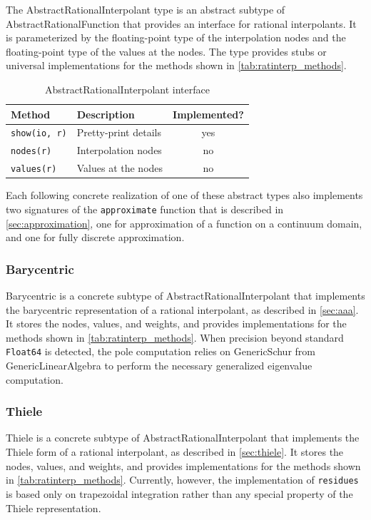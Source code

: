 \documentclass{juliacon}
\begin{document}
The AbstractRationalInterpolant type is an abstract subtype of \textsf{AbstractRationalFunction} that provides an interface for rational interpolants. It is parameterized by the floating-point type of the interpolation nodes and the floating-point type of the values at the nodes. The type provides stubs or universal implementations for the methods shown in \autoref{tab:ratinterp_methods}.

\begin{table}
    \caption{AbstractRationalInterpolant interface}
    \begin{tabular}{l|l|c}\hline
        Method & Description & Implemented? \\\hline
        \verb|show(io, r)| & Pretty-print details & yes \\
        \verb|nodes(r)| & Interpolation nodes & no \\
        \verb|values(r)| & Values at the nodes & no \\
    \end{tabular}
    \label{tab:ratinterp_methods}
\end{table}

Each following concrete realization of one of these abstract types also implements two signatures of the \texttt{approximate} function that is described in \autoref{sec:approximation}, one for approximation of a function on a continuum domain, and one for fully discrete approximation.

\subsubsection{Barycentric}

Barycentric is a concrete subtype of AbstractRationalInterpolant that implements the barycentric representation of a rational interpolant, as described in \autoref{sec:aaa}. It stores the nodes, values, and weights, and provides implementations for the methods shown in \autoref{tab:ratinterp_methods}. When precision beyond standard \verb|Float64| is detected, the pole computation relies on GenericSchur from \textsf{GenericLinearAlgebra} to perform the necessary generalized eigenvalue computation.

\subsubsection{Thiele}

Thiele is a concrete subtype of AbstractRationalInterpolant that implements the Thiele form of a rational interpolant, as described in \autoref{sec:thiele}. It stores the nodes, values, and weights, and provides implementations for the methods shown in \autoref{tab:ratinterp_methods}. Currently, however, the implementation of \verb|residues| is based only on trapezoidal integration rather than any special property of the Thiele representation. 
\end{document}
